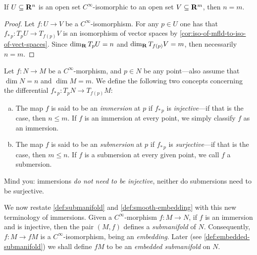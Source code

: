 \begin{corollary}
    \label{cor:dimension-invariance}
    If \(U \subseteq \mathbf{R}^n\) is an open set \(C^{\infty}\)-isomorphic to an open set
    \(V \subseteq \mathbf{R}^m\), then \(n = m\).
\end{corollary}

\begin{proof}
    Let \(f: U \to V\) be a \(C^{\infty}\)-isomorphism. For any \(p \in U\) one has
    that \(f_{*\, p}: T_p U \to T_{f(p)} V\) is an isomorphism of vector spaces by
    \cref{cor:iso-of-mfld-to-iso-of-vect-spaces}. Since \(\dim_{\mathbf{R}} T_p U = n\) and
    \(\dim_{\mathbf{R}} T_{f(p)} V = m\), then necessarily \(n = m\).
\end{proof}

\begin{definition}
    \label{def:immersion-and-submersion}
    Let \(f: N \to M\) be a \(C^{\infty}\)-morphism, and \(p \in N\) be any
    point---also assume that \(\dim N = n\) and \(\dim M = m\). We define the
    following two concepts concerning the differential
    \(f_{*\, p}: T_p N \to T_{f(p)} M\):
    \begin{enumerate}[(a)]\setlength\itemsep{0em}
        \item The map \(f\) is said to be an \emph{immersion} at \(p\) if \(f_{*\, p}\)
              is \emph{injective}---if that is the case, then \(n \leq m\). If \(f\) is an
              immersion at every point, we simply classify \(f\) as an immersion.
        \item The map \(f\) is said to be an \emph{submersion} at \(p\) if \(f_{*\, p}\)
              is \emph{surjective}---if that is the case, then \(m \leq n\). If \(f\) is a
              submersion at every given point, we call \(f\) a submersion.
    \end{enumerate}
\end{definition}

\begin{remark}
    \label{rem:immersion-submersion-not-injective-not-surjective}
    Mind you: immersions \emph{do not need to be injective}, neither do
    submersions need to be surjective.
\end{remark}

We now restate \cref{def:submanifold} and \cref{def:smooth-embedding} with this
new terminology of immersions. Given a \(C^{\infty}\)-morphism \(f: M \to N\),
if \(f\) is an immersion and is injective, then the pair \((M, f)\) defines a
\emph{submanifold} of \(N\). Consequently, \(f: M \to f M\) is a
\(C^\infty\)-isomorphism, being an \emph{embedding}. Later (see
\cref{def:embedded-submanifold}) we shall define \(f M\) to be an \emph{embedded
    submanifold} on \(N\).

